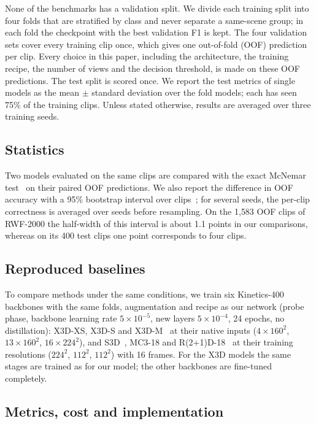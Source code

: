 \documentclass[conference]{IEEEtran}
\begin{document}
None of the benchmarks has a validation split. We divide each training
split into four folds that are stratified by class and never separate a
same-scene group; in each fold the checkpoint with the best validation F1
is kept. The four validation sets cover every training clip once, which
gives one out-of-fold (OOF) prediction per clip. Every choice in this
paper, including the architecture, the training recipe, the number of views
and the decision threshold, is made on these OOF predictions. The test
split is scored once. We report the test metrics of single models as the
mean $\pm$ standard deviation over the fold models; each has seen 75\% of
the training clips. Unless stated otherwise, results are averaged over
three training seeds.

\subsection{Statistics}

Two models evaluated on the same clips are compared with the exact McNemar
test~\cite{mcnemar} on their paired OOF predictions. We also report the
difference in OOF accuracy with a 95\% bootstrap interval over
clips~\cite{bootstrap}; for several seeds, the per-clip correctness is
averaged over seeds before resampling. On the 1{,}583 OOF clips of
RWF-2000 the half-width of this interval is about 1.1 points in our
comparisons, whereas on its 400 test clips one point corresponds to four
clips.

\subsection{Reproduced baselines}

To compare methods under the same conditions, we train six Kinetics-400
backbones with the same folds, augmentation and recipe as our network
(probe phase, backbone learning rate $5\times10^{-5}$, new layers
$5\times10^{-4}$, 24 epochs, no distillation): X3D-XS, X3D-S and
X3D-M~\cite{x3d} at their native inputs ($4\times160^2$, $13\times160^2$,
$16\times224^2$), and S3D~\cite{s3d}, MC3-18 and
R(2+1)D-18~\cite{r2plus1d} at their training resolutions ($224^2$,
$112^2$, $112^2$) with 16 frames. For the X3D models the same stages are trained as for our model; the
other backbones are fine-tuned completely.

\subsection{Metrics, cost and implementation}
\end{document}
